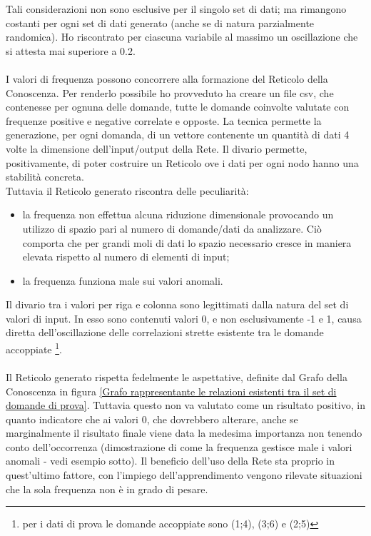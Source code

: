 \noindent
Tali considerazioni non sono esclusive per il singolo set di dati; ma rimangono costanti per ogni set di dati generato (anche se di natura parzialmente randomica). Ho riscontrato per ciascuna variabile al massimo un oscillazione che si attesta mai superiore a 0.2.
\\\\
I valori di frequenza possono concorrere alla formazione del Reticolo della Conoscenza. Per renderlo possibile ho provveduto ha creare un file csv, che contenesse per ognuna delle domande, tutte le domande coinvolte valutate con frequenze positive e negative correlate e opposte. La tecnica permette la generazione, per ogni domanda, di un vettore contenente un quantit\`a di dati 4 volte la dimensione dell'input/output della Rete.
Il divario permette, positivamente, di poter costruire un Reticolo ove i dati per ogni nodo hanno una stabilit\`a concreta.\\
Tuttavia il Reticolo generato riscontra delle peculiarit\`a:
\begin{itemize}
\item la frequenza non effettua alcuna riduzione dimensionale provocando un utilizzo di spazio pari al numero di domande/dati da analizzare. Ci\`o comporta che per grandi moli di dati lo spazio necessario cresce in maniera elevata rispetto al numero di elementi di input;
\item la frequenza funziona male sui valori anomali.
\end{itemize}
\noindent
Il divario tra i valori per riga e colonna sono legittimati dalla natura del set di valori di input. In esso sono contenuti valori 0, e non esclusivamente -1 e 1, causa diretta dell'oscillazione delle correlazioni strette esistente tra le domande accoppiate \footnote{per i dati di prova le domande accoppiate sono (1;4), (3;6) e (2;5)}.\\\\
\noindent
Il Reticolo generato rispetta fedelmente le aspettative, definite dal Grafo della Conoscenza in figura \ref{Grafo rappresentante le relazioni esistenti tra il set di domande di prova}. Tuttavia questo non va valutato come un risultato positivo, in quanto indicatore che ai valori 0, che dovrebbero alterare, anche se marginalmente il risultato finale viene data la medesima importanza non tenendo conto dell'occorrenza (dimostrazione di come la frequenza gestisce male i valori anomali - vedi esempio sotto). Il beneficio dell'uso della Rete sta proprio in quest'ultimo fattore, con l'impiego dell'apprendimento vengono rilevate situazioni che la sola frequenza non \`e in grado di pesare.



